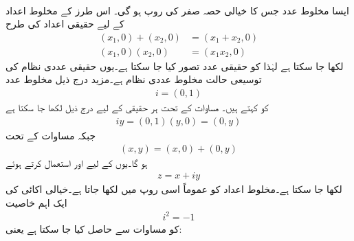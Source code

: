 \\
ایسا مخلوط عدد جس کا خیالی حصہ صفر کی روپ  ہو گی۔ اس طرز کے مخلوط اعداد کے لیے حقیقی اعداد کی طرح 
\begin{align*}
(x_1,0)+(x_2,0)&=(x_1+x_2,0)\\
(x_1,0)(x_2,0)&=(x_1x_2,0)
\end{align*}
لکھا جا سکتا ہے لہٰذا   کو حقیقی عدد تصور کیا جا سکتا ہے۔یوں حقیقی عددی نظام کی توسیعی حالت مخلوط عددی نظام ہے۔مزید درج ذیل مخلوط عدد
\begin{align*}
i=(0,1)
\end{align*}
 کو  کہتے ہیں۔ مساوات  کے تحت ہر حقیقی  کے لیے درج ذیل لکھا جا سکتا ہے
\begin{align*}
iy=(0,1)(y,0)=(0,y)
\end{align*}
جبکہ مساوات  کے تحت
\begin{align*}
(x,y)=(x,0)+(0,y)
\end{align*}
ہو گا۔یوں  کے لیے  اور  استعمال کرتے ہوئے 
\begin{align*}
z=x+iy
\end{align*}
لکھا جا سکتا ہے۔مخلوط اعداد کو عموماً اسی روپ میں لکھا جاتا ہے۔خیالی اکائی  کی ایک اہم خاصیت 
\begin{align}\label{مساوات_مخلوط_مربع_خیالی_اکائی}
i^2=-1
\end{align}
کو مساوات  سے حاصل کیا جا سکتا ہے یعنی:    

